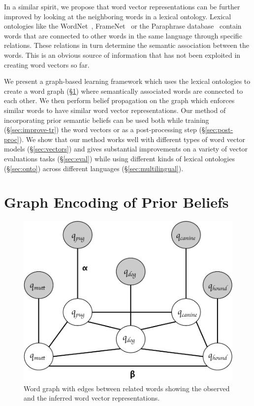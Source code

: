 \documentclass[11pt]{article}
\begin{document}
In a similar spirit, we propose that
word vector representations can be further improved by looking at the neighboring words
in a lexical ontology. Lexical ontologies like the WordNet~\cite{miller:1995}, 
FrameNet~\cite{Baker:1998:BFP:980845.980860} or the Paraphrase 
database~\cite{ganitkevitch2013ppdb} contain words that are connected to other words in 
the same language through specific relations. These relations in turn determine the semantic
association between the words. This is an obvious source of information that has not been
exploited in creating word vectors so far. 

We present a graph-based learning framework which
uses the lexical ontologies to create a word graph (\S\ref{sec:graph}) where semantically associated words
are connected to each other. We then perform belief propagation on the graph which enforces
similar words to have similar word vector representations. Our method of incorporating prior
semantic beliefs can be used both while training (\S\ref{sec:improve-tr}) the word vectors or as a 
post-processing step (\S\ref{sec:post-proc}). 
We show that our method works well with
different types of word vector models (\S\ref{sec:vectors}) and gives substantial improvements on a 
variety of vector evaluations tasks (\S\ref{sec:eval}) while using different kinds of lexical ontologies (\S\ref{sec:onto}) across different languages (\S\ref{sec:multilingual}).

\section{Graph Encoding of Prior Beliefs}
\label{sec:graph}

\begin{figure}[tb]
  \centering
  \includegraphics[width=\columnwidth]{diagram.pdf}
  \caption{Word graph with edges between related words showing the observed and the inferred word vector representations.}
  \label{fig:word-graph}
\end{figure}
\end{document}
